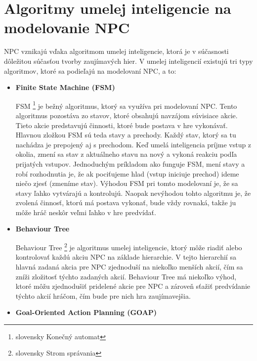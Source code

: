 \documentclass[10pt,twoside,slovak,a4paper]{article}
\begin{document}
\section{Algoritmy umelej inteligencie na modelovanie NPC} 
\quad NPC vznikajú vďaka algoritmom umelej inteligencie, ktorá je v súčasnosti dôležitou súčasťou tvorby zaujímavých hier. V umelej inteligencií existujú tri typy algoritmov, ktoré sa podieľajú na modelovaní NPC, a to: \cite{NPC}
\begin{itemize}
\item \textbf{Finite State Machine (FSM)}

\quad FSM \footnote{slovensky Konečný automat} je bežný algoritmus, ktorý sa využíva pri modelovaní NPC. Tento algoritmus pozostáva zo stavov, ktoré obsahujú navzájom súvisiace akcie. \cite{FSM} Tieto akcie predstavujú činnosti, ktoré bude postava v hre vykonávať. Hlavnou zložkou FSM sú teda stavy a prechody. Každý stav, ktorý sa tu nachádza je prepojený aj s prechodom. Keď umelá inteligencia príjme vstup z okolia, zmení sa stav z aktuálneho stavu na nový a vykoná reakciu podľa prijatých vstupov. Jednoduchým príkladom ako funguje FSM, mení stavy a robí rozhodnutia je, že ak pociťujeme hlad (vstup iniciuje prechod) ideme niečo zjesť (zmeníme stav). \cite{FSM} Výhodou FSM pri tomto modelovaní je, že sa stavy ľahko vytvárajú a kontrolujú. Naopak nevýhodou tohto algoritmu je, že zvolená činnosť, ktorú má postava vykonať, bude vždy rovnaká, takže ju môže hráč neskôr veľmi ľahko v hre predvídať. \cite{rozhod}


\item \textbf{Behaviour Tree}

\quad Behaviour Tree \footnote{slovensky Strom správania} je algoritmus umelej inteligencie, ktorý môže riadiť alebo kontrolovať každú akciu NPC na základe hierarchie. V tejto hierarchií sa hlavná zadaná akcia pre NPC zjednoduší na niekoľko menších akcií, čím sa zníži zložitosť týchto zadaných akcií. Behaviour Tree má niekoľko výhod, ktoré môžu zjednodušiť pridelené akcie pre NPC a zároveň sťažiť predvídanie týchto akcií hráčom, čím bude pre nich hra zaujímavejšia.   

\item \textbf{Goal-Oriented Action Planning (GOAP)}


\end{itemize}
\end{document}
